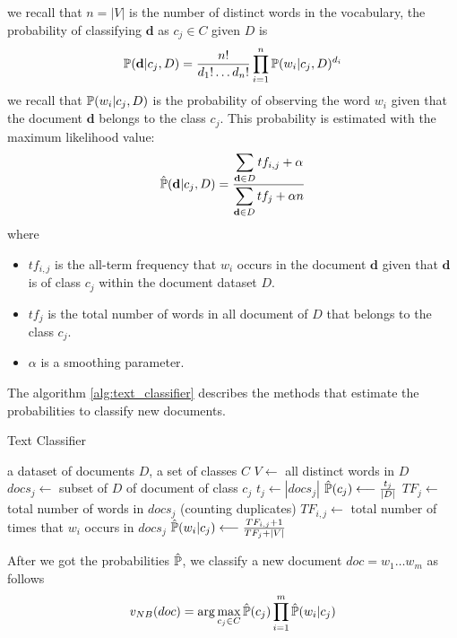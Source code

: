\documentclass[10pt, letterpaper]{report}
\begin{document}
we recall that $n=|V|$ is the number of distinct words in the vocabulary, the probability of classifying $\mathbf d$ as $c_j\in C$ given $D$ is\begin{equation}
    {\mathbb P}(\mathbf d|c_j,D)=\frac{n!}{d_1!\dots d_n!}\prod_{i=1}^{n}{\mathbb P}(w_i|c_j,D)^{d_i}
\end{equation}
we recall that ${\mathbb P}(w_i|c_j,D)$ is the probability of observing the word $w_i$ given that the document $\mathbf d$ belongs to the class $c_j$.  This probability is estimated with the maximum likelihood value:\begin{equation}
    \hat{{\mathbb P}}(\mathbf d|c_j,D)=\frac{\displaystyle  
    \sum_{\mathbf d \in D}tf_{i,j}+\alpha
    }{\displaystyle  
    \sum_{\mathbf d \in D}tf_{j}+\alpha n
    }
\end{equation}
where\begin{itemize}
    \item $tf_{i,j}$ is the all-term frequency that $w_i$ occurs in the document $\mathbf d$ given that $\mathbf d$ is of class $c_j$ within the document dataset $D$.
    \item $tf_{j}$ is the total number of words in all document of $D$ that belongs to the class $c_j$.
    \item $\alpha$ is a smoothing parameter.
\end{itemize}
The algorithm \ref{alg:text_classifier} describes the methods that estimate the probabilities to classify new documents.\bigskip

\begin{algorithm}
    \caption{Text Classifier}\label{alg:text_classifier}
    \begin{algorithmic}
    \Require a dataset of documents $D$, a set of classes $C$
    \State $V\longleftarrow$ all distinct words in $D$
    \State $docs_j\longleftarrow$ subset of $D$ of document of class $c_j$
    \State $t_j\longleftarrow |docs_j|$
    \State $\hat{{\mathbb P}}(c_j)\longleftarrow \frac{t_j}{|D|}$
    \State $TF_j\longleftarrow$ total number of words in $docs_j$ (counting duplicates)
    \State $TF_{i,j}\longleftarrow$ total number of times that $w_i$ occurs in $docs_j$
    \State $\hat{{\mathbb P}}(w_i|c_j)\longleftarrow \frac{TF_{i,j}+1}{TF_j+|V|}$
    \EndFor
    \EndFor
    \end{algorithmic}
\end{algorithm}

After we got the probabilities $\hat{{\mathbb P}}$, we classify a new document $doc=w_1\dots w_{m}$ as follows\begin{equation}
    v_{NB}(doc)=\arg\max_{c_j\in C}\hat{{\mathbb P}}(c_j)\prod_{i=1}^{m}\hat{{\mathbb P}}(w_i|c_j)
\end{equation}
\end{document}
